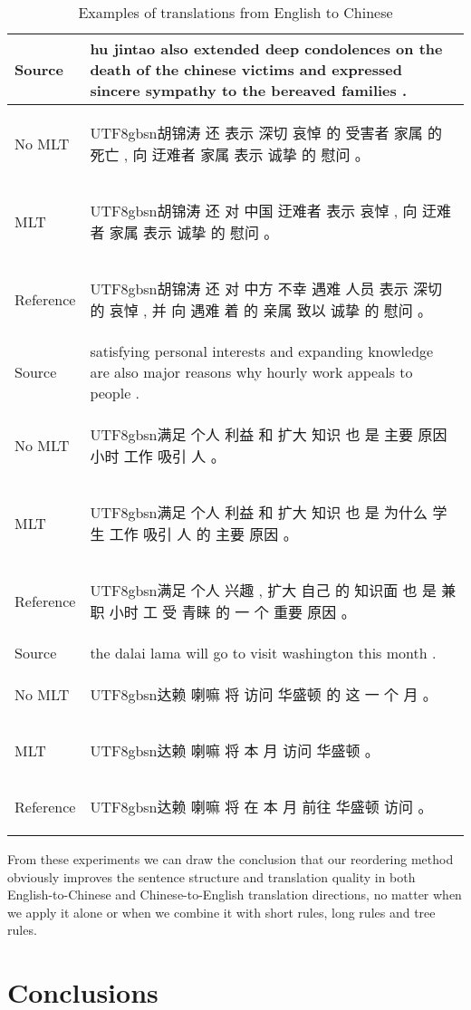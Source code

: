 \documentclass[a4paper]{article}
\newcommand{\cntext}[1]{\begin{CJK}{UTF8}{gbsn}#1\end{CJK}}
\begin{document}
\begin{table*}
\centering
\begin{tabular}{|l|m{}|} \hline
Source & hu jintao also extended deep condolences on the death of the chinese victims and expressed sincere sympathy to the bereaved families .
\\ \hline
No MLT & \cntext{胡锦涛 还 表示 深切 哀悼 的 受害者 家属 的 死亡 , 向 迂难者 家属 表示 诚挚 的 慰问 。} \\ \hline
MLT & \cntext{胡锦涛 还 对 中国 迂难者 表示 哀悼 , 向 迂难者 家属 表示 诚挚 的 慰问 。} \\ \hline 
Reference & \cntext{胡锦涛 还 对 中方 不幸 遇难 人员 表示 深切 的 哀悼 , 并 向 遇难 着 的 亲属 致以 诚挚 的 慰问 。} \\ \hline \hline
Source & satisfying personal interests and expanding knowledge are also major reasons why hourly work appeals to people .\\ \hline
No MLT & \cntext{满足 个人 利益 和 扩大 知识 也 是 主要 原因 小时 工作 吸引 人 。} \\ \hline
MLT & \cntext{满足 个人 利益 和 扩大 知识 也 是 为什么 学生 工作 吸引 人 的 主要 原因 。} \\ \hline 
Reference & \cntext{满足 个人 兴趣 , 扩大 自己 的 知识面 也 是 兼职 小时 工 受 青睐 的 一 个 重要 原因 。} \\ \hline \hline

Source & the dalai lama will go to visit washington this month .\\ \hline
No MLT & \cntext{达赖 喇嘛 将 访问 华盛顿 的 这 一 个 月 。} \\ \hline
MLT & \cntext{达赖 喇嘛 将 本 月 访问 华盛顿 。} \\ \hline
Reference & \cntext{达赖 喇嘛 将 在 本 月 前往 华盛顿 访问 。} \\ \hline
\end{tabular}
\caption{Examples of translations from English to Chinese}
\label{t2}
\end{table*}

From these experiments we can draw the conclusion that our reordering method obviously improves the sentence structure and  translation quality in both English-to-Chinese and Chinese-to-English translation directions, no matter when we apply it alone or when we combine it with short rules, long rules and tree rules. 

\section{Conclusions}
\label{co}
\end{document}
